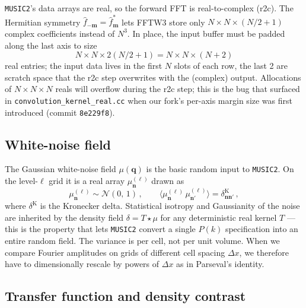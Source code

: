 \documentclass[12pt]{article}
\newcommand{\bq}{\mathbf{q}}
\newcommand{\bn}{\mathbf{n}}
\newcommand{\bm}{\mathbf{m}}
\newcommand{\code}[1]{\texttt{#1}}
\begin{document}
\texttt{MUSIC2}'s data arrays are real, so the forward FFT is
real-to-complex (r2c).  The Hermitian symmetry
$\hat f_{-\bm} = \hat f^*_\bm$ lets FFTW3 store only $N \times N \times (N/2 + 1)$
complex coefficients instead of $N^3$.  In place, the input buffer
must be padded along the last axis to size
\begin{equation}
  N \times N \times 2(N/2 + 1) = N \times N \times (N + 2)
  \label{eq:r2c-padding}
\end{equation}
real entries; the input data lives in the first $N$ slots of each row,
the last 2 are scratch space that the r2c step overwrites with the
(complex) output.  Allocations of $N \times N \times N$ reals will
overflow during the r2c step; this is the bug that surfaced in
\code{convolution\_kernel\_real.cc} when our fork's per-axis margin
size was first introduced (commit \texttt{8e229f8}).

\subsection{White-noise field}
\label{sec:notation-noise}

The Gaussian white-noise field $\mu(\bq)$ is the basic random input
to \texttt{MUSIC2}.  On the level-$\ell$ grid it is a real array
$\mu^{(\ell)}_\bn$ drawn as
\begin{equation}
  \mu^{(\ell)}_\bn \sim \mathcal{N}(0,\,1)\,,
  \qquad
  \langle \mu^{(\ell)}_\bn\,\mu^{(\ell)}_{\bn'}\rangle = \delta^\mathrm{K}_{\bn\bn'}\,,
  \label{eq:noise-stats}
\end{equation}
where $\delta^\mathrm{K}$ is the Kronecker delta.  Statistical
isotropy and Gaussianity of the noise are inherited by the density
field $\delta = T\!\star\!\mu$ for any deterministic real kernel
$T$ --- this is the property that lets \texttt{MUSIC2} convert a
single $P(k)$ specification into an entire random field.  The
variance is per cell, not per unit volume.  When we compare Fourier
amplitudes on grids of different cell spacing $\Delta x$, we
therefore have to dimensionally rescale by powers of $\Delta x$ as
in Parseval's identity.

\subsection{Transfer function and density contrast}
\label{sec:notation-tf}
\end{document}
